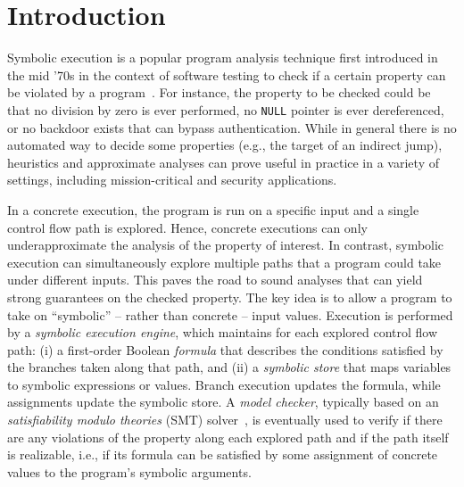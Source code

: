 
\section{Introduction}
\label{se:intro}

Symbolic execution is a popular program analysis technique first introduced in the mid '70s in the context of software testing to check if a certain property can be violated by a program~\cite{K-ICRS75,SELECT-ICRS75,K-CACM76,H-TSE77}. For instance, the property to be checked could be that no division by zero is ever performed, no {\tt NULL} pointer is ever dereferenced, or no backdoor exists that can bypass authentication. While in general there is no automated way to decide some properties (e.g., the target of an indirect jump), heuristics and approximate analyses can prove useful in practice in a variety of settings, including mission-critical and security applications.


In a concrete execution, the program is run on a specific input and a single control flow path is explored. Hence, concrete executions can only underapproximate the analysis of the property of interest. In contrast, symbolic execution can simultaneously explore multiple paths that a program could take under different inputs. This paves the road to sound analyses that can yield strong guarantees on the checked property. 
The key idea is to allow a program to take on ``symbolic'' -- rather than concrete -- input values. Execution is performed by a {\em symbolic execution engine}, which maintains for each explored control flow path: (i) a first-order Boolean {\em formula} that describes the conditions satisfied by the branches taken along that path, and (ii) a {\em symbolic store} that maps variables to symbolic expressions or values. Branch execution updates the formula, while assignments update the symbolic store. A {\em model checker}, typically based on an {\em satisfiability modulo theories} (SMT) solver~\cite{HandbookOfSAT2009}, is eventually used to verify if there are any violations of the property along each explored path and if the path itself is realizable, i.e., if its formula can be satisfied by some assignment of concrete values to the program's symbolic arguments.

